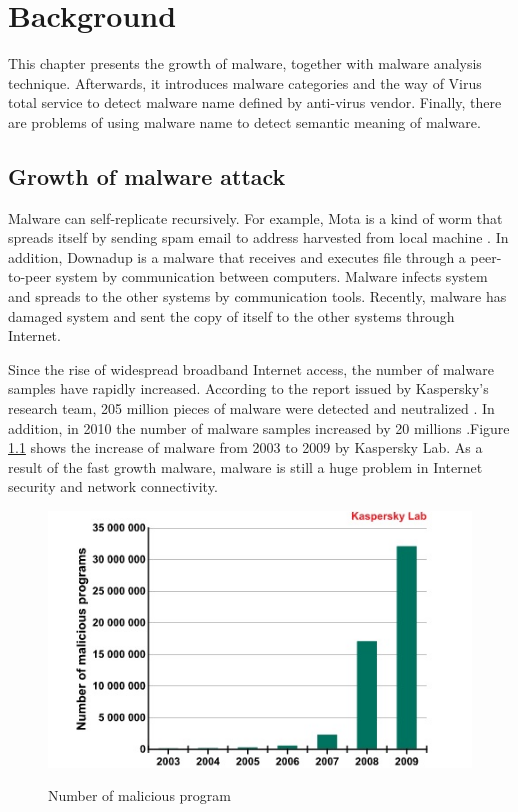 
\chapter{Background}\label{chap:2}
This chapter presents the growth of malware, together with malware analysis technique. Afterwards, it introduces malware categories and the way of Virus total service to detect malware name defined by anti-virus vendor. Finally, there are problems of using malware name to detect semantic meaning of malware. 
%
%
\section{Growth of malware attack}
Malware can self-replicate recursively. For example, Mota is a kind of worm that spreads itself by sending spam email to address harvested from local machine \cite{mota}. In addition, Downadup is a malware that receives and executes file through a peer-to-peer system by communication between computers\cite{downadup}. Malware infects system and spreads to the other systems by communication tools. Recently, malware has damaged system and sent the copy of itself to the other systems through Internet.

Since the rise of widespread broadband Internet access, the number of malware samples have rapidly increased. According to the report issued by Kaspersky's research team, 205 million pieces of malware were detected and neutralized \cite{kaspersky1}. In addition, in 2010 the number of malware samples increased by 20 millions \cite{kaspersky}.Figure \ref{fig:kaspersky} shows the increase of malware from 2003 to 2009 by Kaspersky Lab. As a result of the fast growth malware, malware is still a huge problem in Internet security and network connectivity. 
\begin{figure}[h!]
\centering
\includegraphics[width=1\textwidth]{graph/kapersky.jpg}
\caption{Number of malicious program}\cite{kaspersky}
\label{fig:kaspersky}
\end{figure}

